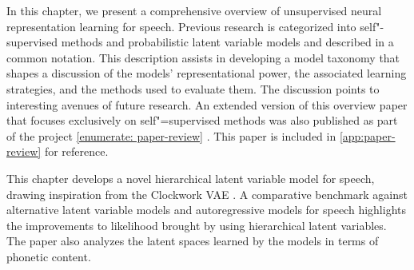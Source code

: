 In this chapter, we present a comprehensive overview of unsupervised neural representation learning for speech. Previous research is categorized into self"-supervised methods and probabilistic latent variable models and described in a common notation. This description assists in developing a model taxonomy that shapes a discussion of the models' representational power, the associated learning strategies, and the methods used to evaluate them. The discussion points to interesting avenues of future research. 
An extended version of this overview paper that focuses exclusively on self"=supervised methods was also published as part of the project \ref{enumerate: paper-review} \parencite{mohamed_selfsupervised_2022}. This paper is included in \cref{app:paper-review} for reference.

This chapter develops a novel hierarchical latent variable model for speech, drawing inspiration from the Clockwork VAE \parencite{saxena_clockwork_2021}. A comparative benchmark against alternative latent variable models and autoregressive models for speech highlights the improvements to likelihood brought by using hierarchical latent variables. The paper also analyzes the latent spaces learned by the models in terms of phonetic content.





